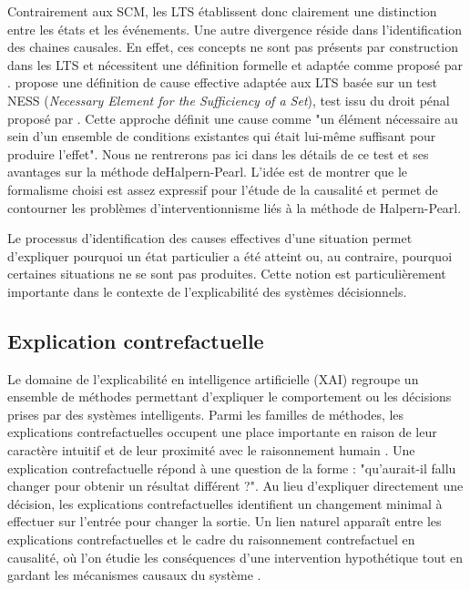 Contrairement aux SCM, les LTS établissent donc clairement une distinction entre les états et les événements. Une autre divergence réside dans l'identification des chaines causales. En effet, ces concepts ne sont pas présents par construction dans les LTS et nécessitent une définition formelle et adaptée comme proposé par \textcite{sarmiento2023actionlanguagesbasedactual}. \textcite{sarmientolozano} propose une définition de cause effective adaptée aux LTS basée sur un test NESS (\textit{Necessary Element for the Sufficiency of a Set}), test issu du droit pénal proposé par \textcite{wright1985causation}. Cette approche définit une cause comme "un élément nécessaire au sein d'un ensemble de conditions existantes qui était lui-même suffisant pour produire l'effet". Nous ne rentrerons pas ici dans les détails de ce test et ses avantages sur la méthode deHalpern-Pearl. L'idée est de montrer que le formalisme choisi est assez expressif pour l'étude de la causalité et permet de contourner les problèmes d'interventionnisme liés à la méthode de Halpern-Pearl. 

Le processus d'identification des causes effectives d'une situation permet d'expliquer pourquoi un état particulier a été atteint ou, au contraire, pourquoi certaines situations ne se sont pas produites. Cette notion est particulièrement importante dans le contexte de l'explicabilité des systèmes décisionnels.


\subsection{Explication contrefactuelle}

Le domaine de l'explicabilité en intelligence artificielle (XAI) regroupe un ensemble de méthodes permettant d'expliquer le comportement ou les décisions prises par des systèmes intelligents. Parmi les familles de méthodes, les explications contrefactuelles occupent une place importante en raison de leur caractère intuitif et de leur proximité avec le raisonnement humain \parencite{guidotti2024counterfactual}. Une explication contrefactuelle répond à une question de la forme : "qu'aurait-il fallu changer pour obtenir un résultat différent ?". Au lieu d'expliquer directement une décision, les explications contrefactuelles identifient un changement minimal à effectuer sur l'entrée pour changer la sortie. Un lien naturel apparaît entre les explications contrefactuelles et le cadre du raisonnement contrefactuel en causalité, où l'on étudie les conséquences d'une intervention hypothétique tout en gardant les mécanismes causaux du système \parencite{pearl2009causality}. 


